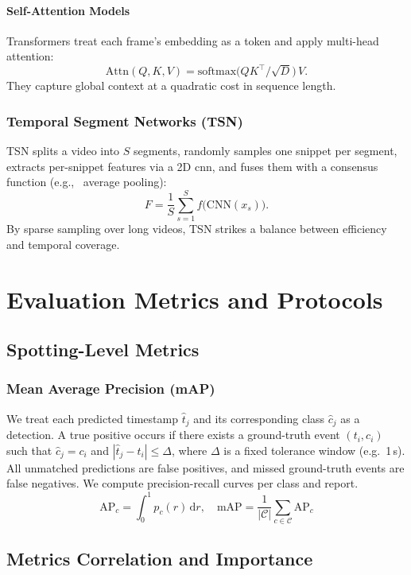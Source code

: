 \paragraph{Self-Attention Models}  
Transformers treat each frame's embedding as a token and apply multi-head attention:
\[
\mathrm{Attn}(Q,K,V) = \mathrm{softmax}\bigl(QK^\top/\sqrt{D}\bigr)\,V.
\]
They capture global context at a quadratic cost in sequence length.

\subsubsection{Temporal Segment Networks (TSN)}  
TSN splits a video into \(S\) segments, randomly samples one snippet per segment, extracts per-snippet features via a 2D \acrshort{cnn}, and fuses them with a consensus function (e.g., \ average pooling):
\[
F = \frac{1}{S}\sum_{s=1}^{S}f\bigl(\mathrm{CNN}(x_s)\bigr).
\]
By sparse sampling over long videos, TSN strikes a balance between efficiency and temporal coverage\cite{wang_tsn_2017}.

\section{Evaluation Metrics and Protocols}
\label{sec:evaluation}

\subsection{Spotting-Level Metrics}
\subsubsection{Mean Average Precision (mAP)}
We treat each predicted timestamp $\hat t_{j}$ and its corresponding class $\hat c_{j}$ as a detection. A true positive occurs if there exists a ground-truth event $(t_{i},c_{i})$ such that $\hat c_{j} = c_{i}$ and $|\hat t_{j} - t_{i}|\le\Delta$, where $\Delta$ is a fixed tolerance window (e.g.\ 1\,s). All unmatched predictions are false positives, and missed ground-truth events are false negatives. We compute precision-recall curves per class and report.
\[
\mathrm{AP}_{c} = \int_{0}^{1} p_{c}(r)\,\mathrm{d}r,\quad
\mathrm{mAP} = \frac{1}{|\mathcal{C}|}\sum_{c\in\mathcal{C}}\mathrm{AP}_{c}
\]

\subsection{Metrics Correlation and Importance}

